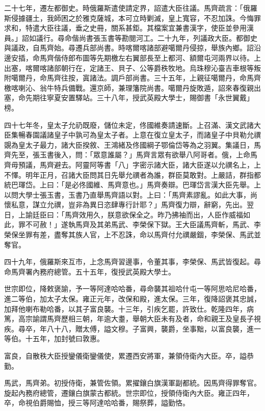 \begin{pinyinscope}
二十七年，遷左都御史。時俄羅斯遣使請定界，詔遣大臣往議。馬齊疏言：「俄羅斯侵據疆土，我師困之於雅克薩城，本可立時剿滅，皇上寬容，不忍加誅。今悔罪求和，特遣大臣往議，垂之史冊，關系甚鉅。其檔案宜兼書漢字，使臣並參用漢員。」詔如議行。尋命偕尚書張玉書等勘閱河工。二十九年，列議政大臣。都御史與議政，自馬齊始。尋遷兵部尚書。時喀爾喀諸部避噶爾丹侵掠，舉族內鄉。詔沿邊安插，命馬齊偕侍郎布圖等先期檄左右翼部長至上都河、額爾屯河兩界以待。上出塞，喀爾喀諸部朝行在，定諸王、貝子、公等爵秩牧地。烏珠穆沁臺吉車根等叛附噶爾丹，命馬齊往按，寘諸法。調戶部尚書。三十五年，上親征噶爾丹，命馬齊檄喀喇沁、翁牛特兵備戰。還京師，兼理籓院尚書。噶爾丹旋敗遁，詔來春復親出塞，命先期往寧夏安置驛站。三十八年，授武英殿大學士，賜御書「永世翼戴」榜。

四十七年冬，皇太子允礽既廢，儲位未定，佟國維奏請速斷。上召滿、漢文武諸大臣集暢春園議諸皇子中孰可為皇太子者。上意在復立皇太子，而諸皇子中貝勒允禩覬為皇太子最力，諸大臣揆敘、王鴻緒及佟國綱子鄂倫岱等為之羽翼。集議日，馬齊先至，張玉書後入，問：「眾意誰屬？」馬齊言眾有欲舉八阿哥者。俄，上命馬齊毋預議，馬齊避去。阿靈阿等書「八」字密示諸大臣，諸大臣遂以允禩名上，上不懌。明年正月，召諸大臣問其日先舉允禩者為誰，群臣莫敢對。上嚴詰，群指都統巴琿岱。上曰：「是必佟國維、馬齊意也。」馬齊奏辯。巴琿岱言漢大臣先舉。上以問大學士張玉書，玉書乃直舉馬齊語以對。上曰：「馬齊素謬亂。如此大事，尚懷私意，謀立允禩，豈非為異日恣肆專行計耶？」馬齊復力辯，辭窮，先出。翌日，上諭廷臣曰：「馬齊效用久，朕意欲保全之。昨乃拂袖而出，人臣作威福如此，罪不可赦！」遂執馬齊及其弟馬武、李榮保下獄。王大臣議馬齊斬，馬武、李榮保坐罪有差，盡奪其族人官，上不忍誅，命以馬齊付允禩嚴錮，李榮保、馬武並奪官。

四十九年，俄羅斯來互市，上念馬齊習邊事，令董其事，李榮保、馬武皆復起。尋命馬齊署內務府總管。五十五年，復授武英殿大學士。

世宗即位，降敕褒諭，予一等阿達哈哈番，尋命襲其祖哈什屯一等阿思哈尼哈番，進二等伯，加太子太保。雍正元年，改保和殿，進太保。三年，復降詔褒其忠誠，加拜他喇布勒哈番，以其子富良襲。十三年，引疾乞罷，許致仕。乾隆四年，病篤，高宗諭謂馬齊歷相三朝，年逾大耋，舉朝大臣未有及者，命和親王及皇長子視疾。尋卒，年八十八，贈太傅，謚文穆。子富興，襲爵，坐事黜，以富良襲，進一等伯。十五年，加封號曰敦惠。

富良，自散秩大臣授鑾儀衛鑾儀使，累遷西安將軍，兼領侍衛內大臣。卒，謚恭勤。

馬武，馬齊弟。初授侍衛，兼管佐領。累擢鑲白旗漢軍副都統。因馬齊得罪奪官。旋起內務府總管，遷鑲白旗蒙古都統。世宗即位，授領侍衛內大臣。雍正四年，卒，命視伯爵賜恤，授三等阿達哈哈番，賜祭葬，謚勤恪。


\end{pinyinscope}
